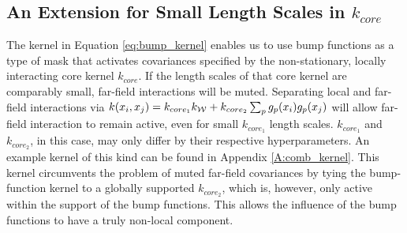 \documentclass{article}
\renewcommand{\mathbf}[1]{%
  \ifx#1x x\else \textbf{#1}\fi
}
\begin{document}
\subsection{An Extension for Small Length Scales in $k_{core}$}
The kernel in Equation \eqref{eq:bump_kernel} enables us to use bump functions as a type of mask that activates covariances specified by the non-stationary, locally interacting core kernel $k_{core}$. If the length scales of that core kernel are comparably small, far-field interactions will be muted. Separating local and far-field interactions via $k(\mathbf{x}_i,\mathbf{x}_j) = k_{core_1}k_{\mathcal{W}} + k_{core_2} \sum_p g_p(\mathbf{x}_i) g_p(\mathbf{x}_j)$ will allow far-field interaction to remain active, even for small $k_{core_1}$ length scales. $k_{core_1}$ and $k_{core_2}$, in this case, may only differ by their respective hyperparameters. An example kernel of this kind can be found in Appendix \ref{A:comb_kernel}.
This kernel circumvents the problem of muted far-field covariances by tying the bump-function kernel to a globally supported $k_{core_2}$, which is, however, only active within the support of the bump functions. This allows the influence of the bump functions to have a truly non-local component. 
\end{document}
